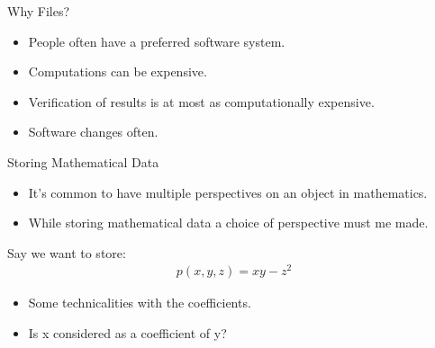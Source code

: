 \documentclass[9pt]{beamer}
\theoremstyle{definition}
\begin{document}


\begin{frame}[fragile]{Why Files?}
  \begin{itemize}
  \item People often have a preferred software system. \pause
  \item Computations can be expensive. \pause
  \item Verification of results is at most as computationally expensive.\pause
  \item Software changes often. \pause
  \end{itemize}
\end{frame}


\begin{frame}[fragile]{Storing Mathematical Data}
  \begin{itemize}
    \item It's common to have multiple perspectives on an object in mathematics. \pause
    \item While storing mathematical data a choice of perspective must me made. \pause
    \end{itemize}

  Say we want to store:
  \begin{align*}
    p(x, y, z) = xy - z^2
  \end{align*} \pause

  \begin{itemize}
  \item Some technicalities with the coefficients.
  \item Is x considered as a coefficient of y?
  \end{itemize}
\end{frame}

\end{document}
